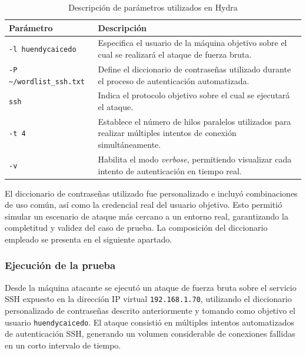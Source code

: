 \begin{table}[H]
	\centering
	\caption{Descripción de parámetros utilizados en Hydra}\label{tab:parametros_hydra}
	\renewcommand{\arraystretch}{1.4}
	\begin{tabular}{|p{4.2cm}|p{8.5cm}|}
	\hline
	\rowcolor{gray!25}
	\centering \textbf{Parámetro} & \centering \textbf{Descripción} \tabularnewline
	\hline

	\centering \texttt{-l huendycaicedo} &
	Especifica el usuario de la máquina objetivo sobre el cual se realizará el ataque de fuerza bruta.
	\tabularnewline
	\hline

	\centering \texttt{-P \textasciitilde{}/wordlist\_ssh.txt} &
	Define el diccionario de contraseñas utilizado durante el proceso de autenticación automatizada.
	\tabularnewline
	\hline

	\centering \texttt{ssh} &
	Indica el protocolo objetivo sobre el cual se ejecutará el ataque.
	\tabularnewline
	\hline

	\centering \texttt{-t 4} &
	Establece el número de hilos paralelos utilizados para realizar múltiples intentos de conexión simultáneamente.
	\tabularnewline
	\hline

	\centering \texttt{-v} &
	Habilita el modo \textit{verbose}, permitiendo visualizar cada intento de autenticación en tiempo real.
	\tabularnewline
	\hline

	\end{tabular}
\end{table}

El diccionario de contraseñas utilizado fue personalizado e incluyó combinaciones de uso común, así como la credencial real del usuario 
objetivo. Esto permitió simular un escenario de ataque más cercano a un entorno real, garantizando la completitud y validez del caso de 
prueba. La composición del diccionario empleado se presenta en el siguiente apartado.

\subsubsection{Ejecución de la prueba}
\noindent

Desde la máquina atacante se ejecutó un ataque de fuerza bruta sobre el servicio SSH expuesto en la dirección IP virtual 
\texttt{192.168.1.70}, utilizando el diccionario personalizado de contraseñas descrito anteriormente y tomando como objetivo el usuario 
\texttt{huendycaicedo}. El ataque consistió en múltiples intentos automatizados de autenticación SSH, generando un volumen considerable de 
conexiones fallidas en un corto intervalo de tiempo.

